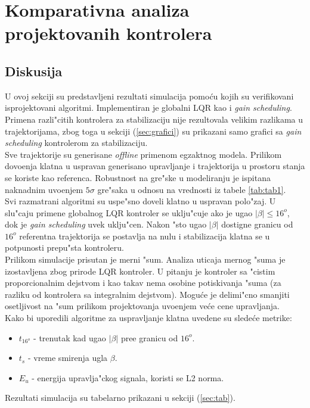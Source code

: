 \documentclass[a4paper,11pt]{article}
\theoremstyle{definition} \newtheorem{deff}{Definicija}[section]
\theoremstyle{definition} \newtheorem{prim}[deff]{Primer}
\theoremstyle{plain} \newtheorem{teor}[deff]{Teorema}
\begin{document}
	\newpage
	
	
	\section{Komparativna analiza projektovanih kontrolera} \label{sec:comp}
	\subsection{Diskusija}
	
	U ovoj sekciji su predstavljeni rezultati simulacija pomo\'cu kojih su verifikovani isprojektovani algoritmi. Implementiran je globalni LQR kao i \emph{gain scheduling}. Primena razli"citih kontrolera za stabilizaciju nije rezultovala velikim razlikama u trajektorijama, zbog toga u sekciji (\ref{sec:grafici}) su prikazani samo grafici sa \emph{gain scheduling} kontrolerom za stabilizaciju. \\ 
	
	Sve trajektorije su generisane \emph{offline} primenom egzaktnog modela. Prilikom dovo\dj enja klatna u uspravan generisano upravljanje i trajektorija u prostoru stanja se koriste kao referenca. Robustnost na gre"ske u modeliranju je ispitana naknadnim uvo\dj enjem $5\sigma$ gre"saka u odnosu na vrednosti iz tabele \ref{tab:tab1}.\\
	
	Svi razmatrani algoritmi su uspe"sno doveli klatno u uspravan polo"zaj. U slu"caju primene globalnog LQR kontroler se uklju"cuje ako je ugao $|\beta| \leq 16^o$, dok je \emph{gain scheduling} uvek uklju"cen. Nakon "sto ugao $|\beta|$ dostigne granicu od $16^o$ referentna trajektorija se postavlja na nulu i stabilizacija klatna se u potpunosti prepu"sta kontroleru.\\
	
	Prilikom simulacije prisutan je merni "sum. Analiza uticaja mernog "suma je izostavljena zbog prirode LQR kontroler. U pitanju je kontroler sa "cistim proporcionalnim dejstvom i kao takav nema osobine potiskivanja "suma (za razliku od kontrolera sa integralnim dejstvom). Mogu\'ce je delimi"cno smanjiti osetljivost na "sum prilikom projektovanja uvo\dj enjem ve\'ce cene upravljanja.\\
	
	Kako bi uporedili algoritme za uspravljanje klatna uvedene su slede\'ce metrike:
	\begin{itemize}
		\item $t_{16^o}$ - trenutak kad ugao $|\beta|$ pre\dj e granicu od $16^o$.
		\item $t_s$ - vreme smirenja ugla $\beta$.
		\item $E_u$ - energija upravlja"ckog signala, koristi se L2 norma.
	\end{itemize}
	Rezultati simulacija su tabelarno prikazani u sekciji (\ref{sec:tab}).\\
	
\end{document}
